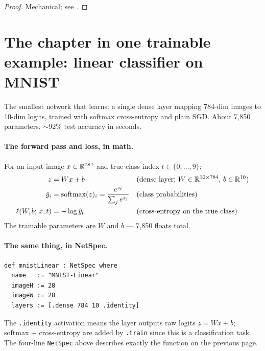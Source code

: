 \begin{theorem}
  \label{thm:identity_has_vjp}
  \leanok
\end{theorem}

\begin{proof}
\leanok
Mechanical; see .
\end{proof}

\section*{The chapter in one trainable example: linear classifier on MNIST}

The smallest network that learns: a single dense layer mapping
784-dim images to 10-dim logits, trained with softmax cross-entropy
and plain SGD. About 7,850 parameters. \(\sim\)92\% test accuracy
in seconds.

\paragraph{The forward pass and loss, in math.}
For an input image \(x \in \mathbb{R}^{784}\) and true class index
\(t \in \{0, \dots, 9\}\):
\begin{align*}
  z &= W x + b
    &&\text{(dense layer; \(W \in \mathbb{R}^{10 \times 784}\), \(b \in \mathbb{R}^{10}\))} \\
  \hat{y}_i &= \mathrm{softmax}(z)_i = \frac{e^{z_i}}{\sum_j e^{z_j}}
    &&\text{(class probabilities)} \\
  \ell(W, b;\, x, t) &= -\log \hat{y}_t
    &&\text{(cross-entropy on the true class)}
\end{align*}
The trainable parameters are \(W\) and \(b\) --- 7,850 floats total.

\paragraph{The same thing, in NetSpec.}
\begin{verbatim}
def mnistLinear : NetSpec where
  name   := "MNIST-Linear"
  imageH := 28
  imageW := 28
  layers := [.dense 784 10 .identity]
\end{verbatim}

The \texttt{.identity} activation means the layer outputs raw
logits \(z = W x + b\); softmax + cross-entropy are added by
\texttt{.train} since this is a classification task. The four-line
\texttt{NetSpec} above describes exactly the function on the
previous page.

